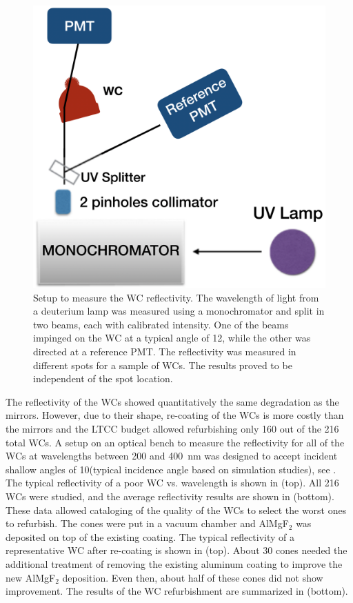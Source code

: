 \begin{figure}[!h]
	\centering
	\includegraphics[width=0.98\columnwidth,keepaspectratio]{img/wcSetup.png}
	\caption{Setup to measure the WC reflectivity. The wavelength of light from a deuterium lamp was measured
          using a monochromator and split in two beams, each with calibrated intensity. One of the beams impinged on
          the WC at a typical angle of 12\mdeg, while the other was directed at a reference PMT. The reflectivity was
          measured in different spots for a sample of WCs.  The results proved to be independent of the spot location.}
	\label{fig:wcSetup}
\end{figure}

The reflectivity of the WCs showed quantitatively the same degradation as the mirrors. However, due to their shape,
re-coating of the WCs is more costly than the mirrors and the LTCC budget allowed refurbishing only 160 out of the
216 total WCs. A setup on an optical bench to measure the reflectivity for all of the WCs at wavelengths between 200
and 400~nm was designed to accept incident shallow angles of 10\mdeg (typical incidence angle based on
simulation studies), see . The typical reflectivity of a poor WC vs. wavelength is shown in 
(top). All 216 WCs were studied, and the average reflectivity results are shown in  (bottom). These
data allowed cataloging of the quality of the WCs to select the worst ones to refurbish. The cones were put in a vacuum
chamber and AlMgF$_2$ was deposited on top of the existing coating. The typical reflectivity of a representative WC
after re-coating is shown in  (top). About 30 cones needed the additional treatment of removing the
existing aluminum coating to improve the new AlMgF$_2$ deposition. Even then, about half of these cones did not show
improvement. The results of the WC refurbishment are summarized in  (bottom).

